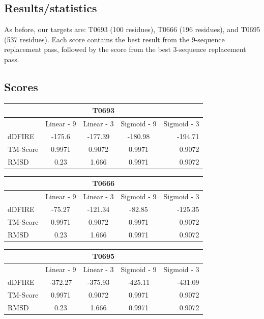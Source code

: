 \documentclass{article}
\begin{document}
\begin{enumerate}
\section{Results/statistics}

As before, our targets are: T0693 (100 residues), T0666 (196 residues), and T0695 (537 residues).  Each score contains the best result from the 9-sequence replacement pass, followed by the score from the best 3-sequence replacement pass.

\subsection{Scores}
\begin{center}
\begin{tabular}{|l|c|c|c|r|}
\multicolumn{5}{c}{T0693} \\
    \hline
      & Linear - 9 & Linear - 3 & Sigmoid - 9 & Sigmoid - 3\\ \hline
    dDFIRE & -175.6 & -177.39 & -180.98 & -194.71 \\ \hline
    TM-Score & 0.9971 & 0.9072 & 0.9971 & 0.9072 \\ \hline
    RMSD & 0.23 & 1.666 & 0.9971 & 0.9072 \\
    \hline
    \end{tabular}
\end{center}

\begin{center}
\begin{tabular}{|l|c|c|c|r|}
\multicolumn{5}{c}{T0666} \\
    \hline
      & Linear - 9 & Linear - 3 & Sigmoid - 9 & Sigmoid - 3\\ \hline
    dDFIRE & -75.27 & -121.34 & -82.85 & -125.35 \\ \hline
    TM-Score & 0.9971 & 0.9072 & 0.9971 & 0.9072 \\ \hline
    RMSD & 0.23 & 1.666 & 0.9971 & 0.9072 \\
    \hline
    \end{tabular}
\end{center}

\begin{center}
\begin{tabular}{|l|c|c|c|r|}
\multicolumn{5}{c}{T0695} \\
    \hline
      & Linear - 9 & Linear - 3 & Sigmoid - 9 & Sigmoid - 3\\ \hline
    dDFIRE &  -372.27 & -375.93 & -425.11 & -431.09 \\ \hline
    TM-Score & 0.9971 & 0.9072 & 0.9971 & 0.9072 \\ \hline
    RMSD & 0.23 & 1.666 & 0.9971 & 0.9072 \\
    \hline
    \end{tabular}
\end{center}


\end{enumerate}
\end{document}
